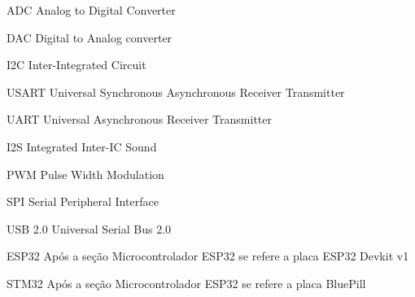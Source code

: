 






\frenchspacing 


	\imprimircapa

	\imprimirfolhaderosto*

	\listoffigures*
	\cleardoublepage

	\listofquadros*
	\cleardoublepage


	\begin{siglas}
		\item[ADC] Analog to Digital Converter
		\item[DAC] Digital to Analog converter
		\item[I2C] Inter-Integrated Circuit
		\item[USART] Universal Synchronous Asynchronous Receiver Transmitter
		\item[UART] Universal Asynchronous Receiver Transmitter
		\item[I2S] Integrated Inter-IC Sound
		\item[PWM] Pulse Width Modulation
		\item[SPI] Serial Peripheral Interface
		\item[USB 2.0] Universal Serial Bus 2.0
		\item[ESP32] Após a seção Microcontrolador ESP32 se refere a placa ESP32 Devkit v1
		\item[STM32] Após a seção Microcontrolador ESP32 se refere a placa BluePill
	\end{siglas}

	\tableofcontents*
	\cleardoublepage


\textual

	

	

